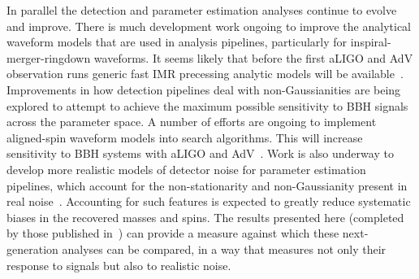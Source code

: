 In parallel the detection and parameter estimation analyses continue to 
evolve and improve. There is much development work ongoing to improve the 
analytical waveform models that are used in analysis pipelines, particularly 
for inspiral-merger-ringdown waveforms. It seems likely that before the 
first aLIGO and AdV observation runs generic fast IMR precessing analytic 
models will be 
available~\cite{Santamaria:2010yb,Taracchini:2012ig,Pan:2013rra,Hannam:2013oca,
Taracchini:2013rva}.
Improvements in how detection pipelines deal with non-Gaussianities are being 
explored to attempt to achieve the maximum possible sensitivity to BBH signals 
across the parameter space. A number of efforts are ongoing to implement 
aligned-spin waveform models into  search algorithms. 
This will increase sensitivity to BBH systems with aLIGO and 
AdV~\cite{Brown:2012qf,Ajith:2012mn,Harry:2013tca}.
Work is also underway to develop more realistic models 
of detector noise for parameter estimation pipelines, which account for the 
non-stationarity and non-Gaussianity present in real 
noise~\cite{Littenberg:2013gja}.  Accounting for such features
is expected to greatly reduce systematic biases in the recovered masses and 
spins.%
The results presented here (completed by those published in~\cite{Aasi:2014tra})
can provide a measure against which these
next-generation analyses can be compared, in a way that measures not only their
response to signals but also to realistic noise.

